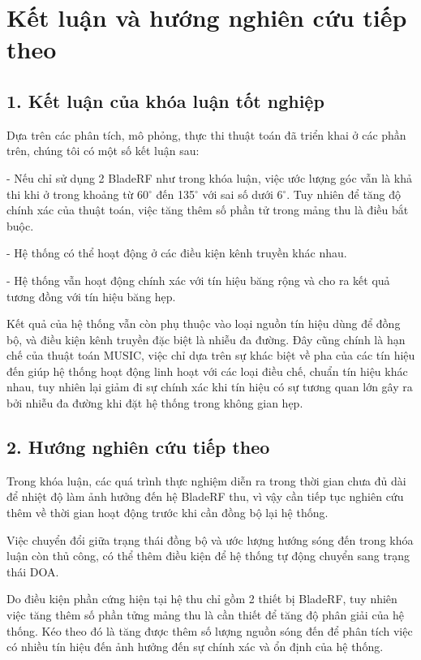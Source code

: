 \clearpage
{}


\chapter*{Kết luận và hướng nghiên cứu tiếp theo}
\section*{1. Kết luận của khóa luận tốt nghiệp}
Dựa trên các phân tích, mô phỏng, thực thi thuật toán đã triển khai ở các phần trên, chúng tôi có một số kết luận sau:

- Nếu chỉ sử dụng 2 BladeRF như trong khóa luận, việc ước lượng góc vẫn là khả thi khi ở trong khoảng từ 60$^{\circ}$ đến 135$^{\circ}$ với sai số dưới 6$^{\circ}$. Tuy nhiên để tăng độ chính xác của thuật toán, việc tăng thêm số phần tử trong mảng thu là điều bắt buộc.

- Hệ thống có thể hoạt động ở các điều kiện kênh truyền khác nhau.

- Hệ thống vẫn hoạt động chính xác với tín hiệu băng rộng và cho ra kết quả tương đồng với tín hiệu băng hẹp.

Kết quả của hệ thống vẫn còn phụ thuộc vào loại nguồn tín hiệu dùng để đồng bộ, và điều kiện kênh truyền đặc biệt là nhiễu đa đường. Đây cũng chính là hạn chế của thuật toán MUSIC, việc chỉ dựa trên sự khác biệt về pha của các tín hiệu đến giúp hệ thống hoạt động linh hoạt với các loại điều chế, chuẩn tín hiệu khác nhau, tuy nhiên lại giảm đi sự chính xác khi tín hiệu có sự tương quan lớn gây ra bởi nhiễu đa đường khi đặt hệ thống trong không gian hẹp.

\section*{2. Hướng nghiên cứu tiếp theo}
Trong khóa luận, các quá trình thực nghiệm diễn ra trong thời gian chưa đủ dài để nhiệt độ làm ảnh hưởng đến hệ BladeRF thu, vì vậy cần tiếp tục nghiên cứu thêm về thời gian hoạt động trước khi cần đồng bộ lại hệ thống.

Việc chuyển đổi giữa trạng thái đồng bộ và ước lượng hướng sóng đến trong khóa luận còn thủ công, có thể thêm điều kiện để hệ thống tự động chuyển sang trạng thái DOA.

Do điều kiện phần cứng hiện tại hệ thu chỉ gồm 2 thiết bị BladeRF, tuy nhiên việc tăng thêm số phần tửng mảng thu là cần thiết để tăng độ phân giải của hệ thống. Kéo theo đó là tăng được thêm số lượng nguồn sóng đến để phân tích việc có nhiều tín hiệu đến ảnh hưởng đến sự chính xác và ổn định của hệ thống.

